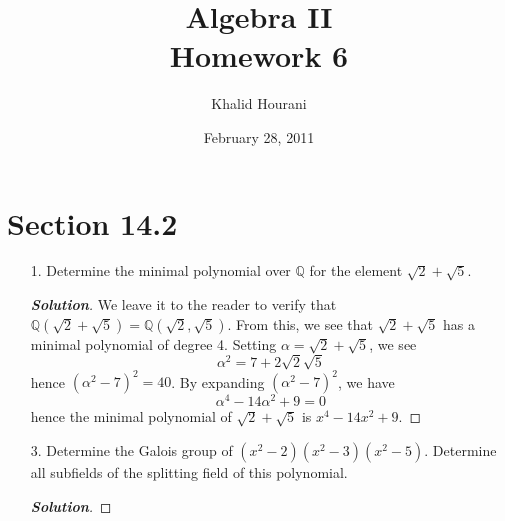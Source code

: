 \documentclass[12pt,leqno]{article}
\title{Algebra II\\\large Homework 6}
\date{February 28, 2011}
\author{Khalid Hourani}
\theoremstyle{definition}
\newcommand{\Q}{\mathbb{Q}}
\newcommand{\+}{\oplus}
\newenvironment{Solution}{\begin{proof}[\textnormal{\textbf{Solution}}]}{\end{proof}}
\begin{document}
 \begin{titlepage}
  \maketitle
 \end{titlepage}

\section*{Section 14.2}
  \begin{enumerate}
   \item [1.] Determine the minimal polynomial over $\Q$ for the element $\sqrt{2}+\sqrt{5}$.
    \begin{Solution}
     We leave it to the reader to verify that $\Q(\sqrt{2}+\sqrt{5})=\Q(\sqrt{2},\sqrt{5})$. From this, we see that $\sqrt{2}+\sqrt{5}$ has a minimal polynomial of degree 4. Setting $\alpha=\sqrt{2}+\sqrt{5}$, we see \[\alpha^2=7+2\sqrt{2}\sqrt{5}\] hence $(\alpha^2-7)^2=40$. By expanding $(\alpha^2-7)^2$, we have \[\alpha^4-14\alpha^2+9=0\] hence the minimal polynomial of $\sqrt{2}+\sqrt{5}$ is $x^4-14x^2+9$. 
    \end{Solution}
   \item [3.] Determine the Galois group of $(x^2-2)(x^2-3)(x^2-5)$. Determine all subfields of the splitting field of this polynomial.
    \begin{Solution}

\end{Solution}
\end{enumerate}
\end{document}
